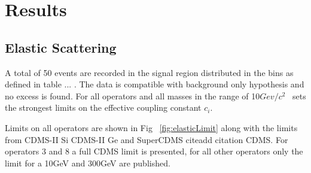 \section{Results}
\subsection{Elastic Scattering}
A total of 50 events are recorded in the signal region distributed in the bins as defined in table ... . The data is compatible with background only hypothesis and no excess is found. For all operators and all masses in the range of 10$Gev/c^2$ \Xehund\ sets the strongest limits on the effective coupling constant $c_i$. 

Limits on all operators are shown in Fig ~\ref{fig:elasticLimit} along with the limits from CDMS-II Si CDMS-II Ge and SuperCDMS cite{add citation CDMS}. For operators 3 and 8 a full CDMS limit is presented, for all other operators only the limit for a 10GeV and 300GeV are published. 


